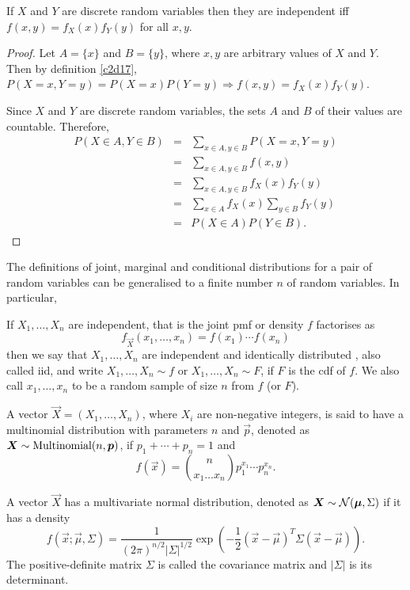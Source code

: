 \documentclass{article}
\begin{document}
\begin{prop}\label{c2p6}
If $X$ and $Y$ are discrete random variables then they are independent iff
$f(x, y) = f_X(x)f_Y(y)$ for all $x, y$.
\end{prop}
\begin{proof}
Let $A = \{x\}$ and $B = \{y\}$, where $x, y$ are arbitrary values of $X$ and
$Y$. Then by definition \ref{c2d17}, $P(X=x, Y=y) = P(X=x)P(Y=y) \Rightarrow
f(x, y) = f_X(x)f_Y(y)$.

Since $X$ and $Y$ are discrete random variables, the sets $A$ and $B$ of their
values are countable. Therefore,
\begin{eqnarray*}
P(X \in A, Y \in B) &=& \sum_{x \in A, y \in B}P(X = x, Y = y) \\
 &=& \sum_{x \in A, y \in B}f(x, y) \\
 &=& \sum_{x\in A, y \in B}f_X(x)f_Y(y) \\
 &=& \sum_{x \in A}f_X(x)\sum_{y \in B}f_Y(y) \\
 &=& P(X \in A)P(Y \in B).
\end{eqnarray*}
\end{proof}

The definitions of joint, marginal and conditional distributions for a pair of
random variables can be generalised to a finite number $n$ of random variables.
In particular,
\begin{defn}\label{c2d18}
If $X_1, \ldots, X_n$ are independent, that is the joint pmf or density $f$ 
factorises as
\[
f_{\vec{X}}(x_1, \ldots, x_n) = f(x_1)\cdots f(x_n)
\]
then we say that $X_1, \ldots, X_n$ are independent and identically distributed
, also called iid, and write $X_1, \ldots, X_n \sim f$ or $X_1, \ldots, X_n \sim
F$, if $F$ is the cdf of $f$. We also call $x_1, \ldots, x_n$ to be a random 
sample of size $n$ from $f$ (or $F$).
\end{defn}

\begin{defn}\label{c2d19}
A vector $\vec{X} = (X_1, \ldots, X_n)$, where $X_i$ are non-negative integers,
is said to have a multinomial distribution with parameters $n$ and $\vec{p}$,
denoted as $\bm{X} \sim \text{Multinomial}(n, \bm{p})$, if $p_1 + \cdots + p_n = 1$ and 
\begin{equation}\label{c2e25}
f(\vec{x}) = \binom{n}{x_1 \ldots x_n}p_1^{x_1}\cdots p_n^{x_n}.
\end{equation}
\end{defn}

\begin{defn}\label{c2d20}
A vector $\vec{X}$ has a multivariate normal distribution, denoted as $\bm{X}
\sim \mathcal{N}(\bm{\mu}, \Sigma)$ if it has a density
\begin{equation}\label{c2e26}
f(\vec{x}; \vec{\mu}, \Sigma) = \frac{1}{(2\pi)^{n/2}|\Sigma|^{1/2}}
\exp\left(-\frac{1}{2}(\vec{x} - \vec{\mu})^T\Sigma(\vec{x} - \vec{\mu})\right).
\end{equation}
The positive-definite matrix $\Sigma$ is called the covariance matrix and 
$|\Sigma|$ is its determinant.
\end{defn}
\end{document}
